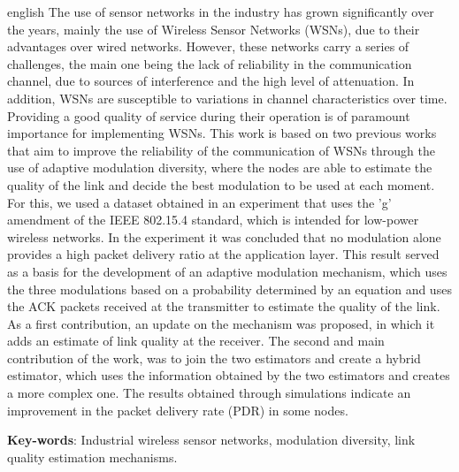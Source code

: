 \begin{resumo}[Abstract]
  \begin{otherlanguage*}{english}
    The use of sensor networks in the industry has grown significantly over the years, mainly the use of Wireless Sensor Networks (WSNs), due to their advantages over wired networks. However, these networks carry a series of challenges, the main one being the lack of reliability in the communication channel, due to sources of interference and the high level of attenuation. In addition, WSNs are susceptible to variations in channel characteristics over time. Providing a good quality of service during their operation is of paramount importance for implementing WSNs. This work is based on two previous works that aim to improve the reliability of the communication of WSNs through the use of adaptive modulation diversity, where the nodes are able to estimate the quality of the link and decide the best modulation to be used at each moment. For this, we used a dataset obtained in an experiment that uses the 'g' amendment of the IEEE 802.15.4 standard, which is intended for low-power wireless networks. In the experiment it was concluded that no modulation alone provides a high packet delivery ratio at the application layer. This result served as a basis for the development of an adaptive modulation mechanism, which uses the three modulations based on a probability determined by an equation and uses the ACK packets received at the transmitter to estimate the quality of the link. As a first contribution, an update on the mechanism was proposed, in which it adds an estimate of link quality at the receiver. The second and main contribution of the work, was to join the two estimators and create a hybrid estimator, which uses the information obtained by the two estimators and creates a more complex one. The results obtained through simulations indicate an improvement in the packet delivery rate (PDR) in some nodes.

    \vspace{\onelineskip}

    \noindent
    \textbf{Key-words}: Industrial wireless sensor networks, modulation diversity, link quality estimation mechanisms.
  \end{otherlanguage*}
\end{resumo}




